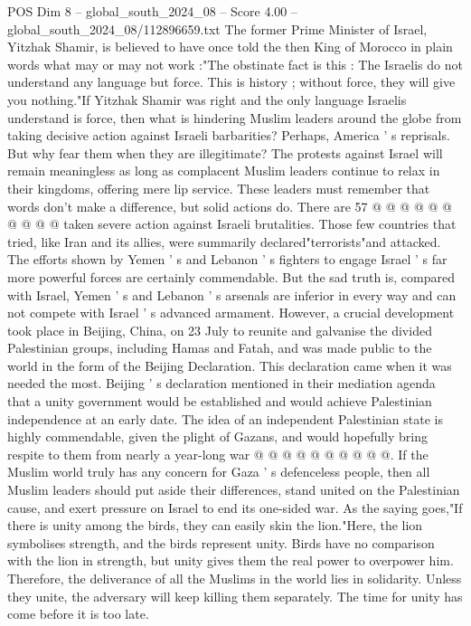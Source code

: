 \begin{textsample}{POS Dim 8 – global\_south\_2024\_08 – Score 4.00 – global\_south\_2024\_08/112896659.txt}
The former Prime Minister of Israel, Yitzhak Shamir, is believed to have once told the then King of Morocco in plain words what may or may not work :"The obstinate fact is this : The Israelis do not understand any language but force.
This is history ; without force, they will give you nothing."If Yitzhak Shamir was right and the only language Israelis understand is force, then what is hindering Muslim leaders around the globe from taking decisive action against Israeli barbarities?
Perhaps, America ' s reprisals.
But why fear them when they are illegitimate?
The protests against Israel will remain meaningless as long as complacent Muslim leaders continue to relax in their kingdoms, offering mere lip service.
These leaders must remember that words don't make a difference, but solid actions do.
There are 57 @ @ @ @ @ @ @ @ @ @ taken severe action against Israeli brutalities.
Those few countries that tried, like Iran and its allies, were summarily declared"terrorists"and attacked.
The efforts shown by Yemen ' s and Lebanon ' s fighters to engage Israel ' s far more powerful forces are certainly commendable.
But the sad truth is, compared with Israel, Yemen ' s and Lebanon ' s arsenals are inferior in every way and can not compete with Israel ' s advanced armament.
However, a crucial development took place in Beijing, China, on 23 July to reunite and galvanise the divided Palestinian groups, including Hamas and Fatah, and was made public to the world in the form of the Beijing Declaration.
This declaration came when it was needed the most.
Beijing ' s declaration mentioned in their mediation agenda that a unity government would be established and would achieve Palestinian independence at an early date.
The idea of an independent Palestinian state is highly commendable, given the plight of Gazans, and would hopefully bring respite to them from nearly a year-long war @ @ @ @ @ @ @ @ @ @.
If the Muslim world truly has any concern for Gaza ' s defenceless people, then all Muslim leaders should put aside their differences, stand united on the Palestinian cause, and exert pressure on Israel to end its one-sided war.
As the saying goes,"If there is unity among the birds, they can easily skin the lion."Here, the lion symbolises strength, and the birds represent unity.
Birds have no comparison with the lion in strength, but unity gives them the real power to overpower him.
Therefore, the deliverance of all the Muslims in the world lies in solidarity.
Unless they unite, the adversary will keep killing them separately.
The time for unity has come before it is too late.

\end{textsample}
